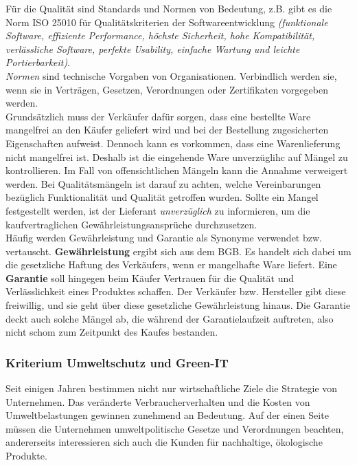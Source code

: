 \documentclass[a4paper, 12pt]{report}
\begin{document}
Für die Qualität sind Standards und Normen von Bedeutung, z.B. gibt es die Norm 
ISO 25010 für Qualitätskriterien der Softwareentwicklung \emph{(funktionale 
Software, effiziente Performance, höchste Sicherheit, hohe Kompatibilität, 
verlässliche Software, perfekte Usability, einfache Wartung und leichte 
Portierbarkeit)}. \\

\emph{Normen} sind technische Vorgaben von Organisationen. Verbindlich werden 
sie, wenn sie in Verträgen, Gesetzen, Verordnungen oder Zertifikaten vorgegeben 
werden. \\

Grundsätzlich muss der Verkäufer dafür sorgen, dass eine bestellte Ware 
mangelfrei an den Käufer geliefert wird und bei der Bestellung zugesicherten 
Eigenschaften aufweist. Dennoch kann es vorkommen, dass eine Warenlieferung 
nicht mangelfrei ist. Deshalb ist die eingehende Ware unverzüglihc auf Mängel 
zu kontrollieren. Im Fall von offensichtlichen Mängeln kann die Annahme 
verweigert werden. Bei Qualitätsmängeln ist darauf zu achten, welche 
Vereinbarungen bezüglich Funktionalität und Qualität getroffen wurden. Sollte 
ein Mangel festgestellt werden, ist der Lieferant \emph{unverzüglich} zu 
informieren, um die kaufvertraglichen Gewährleistungsansprüche durchzusetzen. \\

Häufig werden Gewährleistung und Garantie als Synonyme verwendet bzw. 
vertauscht. \textbf{Gewährleistung} ergibt sich aus dem BGB. Es handelt sich 
dabei um die gesetzliche Haftung des Verkäufers, wenn er mangelhafte Ware 
liefert. Eine \textbf{Garantie} soll hingegen beim Käufer Vertrauen für die 
Qualität und Verlässlichkeit eines Produktes schaffen. Der Verkäufer bzw. 
Hersteller gibt diese freiwillig, und sie geht über diese gesetzliche 
Gewährleistung hinaus. Die Garantie deckt auch solche Mängel ab, die während der
Garantielaufzeit auftreten, also nicht schom zum Zeitpunkt des Kaufes bestanden. 

\subsubsection{Kriterium Umweltschutz und Green-IT}

Seit einigen Jahren bestimmen nicht nur wirtschaftliche Ziele die Strategie von 
Unternehmen. Das veränderte Verbraucherverhalten und die Kosten von 
Umweltbelastungen gewinnen zunehmend an Bedeutung. Auf der einen Seite müssen 
die Unternehmen umweltpolitische Gesetze und Verordnungen beachten, andererseits
interessieren sich auch die Kunden für nachhaltige, ökologische Produkte. \\
\end{document}
